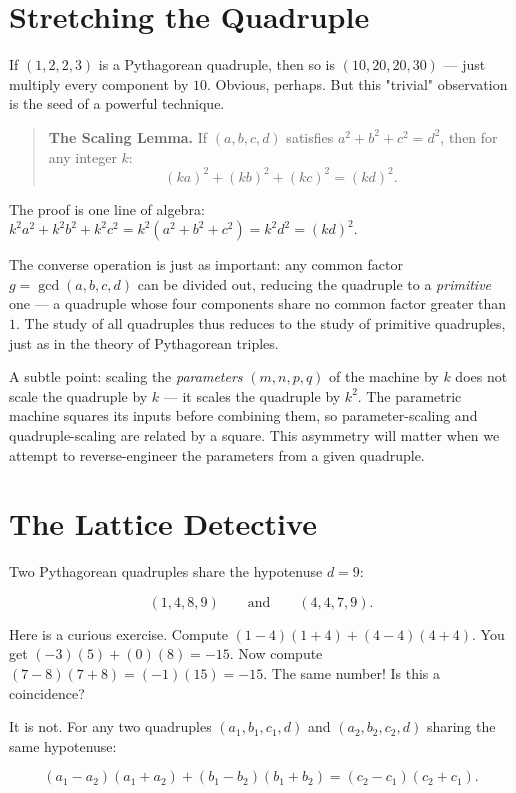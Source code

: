 \documentclass[11pt,twoside,openright]{book}
\theoremstyle{definition}
\theoremstyle{remark}
\begin{document}
\section{Stretching the Quadruple}

If $(1, 2, 2, 3)$ is a Pythagorean quadruple, then so is $(10, 20, 20, 30)$ --- just multiply every component by $10$. Obvious, perhaps. But this "trivial" observation is the seed of a powerful technique.

\begin{quote}
\textbf{The Scaling Lemma.} If $(a, b, c, d)$ satisfies $a^2 + b^2 + c^2 = d^2$, then for any integer $k$:
$$(ka)^2 + (kb)^2 + (kc)^2 = (kd)^2.$$
\end{quote}
The proof is one line of algebra: $k^2 a^2 + k^2 b^2 + k^2 c^2 = k^2(a^2 + b^2 + c^2) = k^2 d^2 = (kd)^2$.

The converse operation is just as important: any common factor $g = \gcd(a, b, c, d)$ can be divided out, reducing the quadruple to a \textit{primitive} one --- a quadruple whose four components share no common factor greater than $1$. The study of all quadruples thus reduces to the study of primitive quadruples, just as in the theory of Pythagorean triples.

A subtle point: scaling the \textit{parameters} $(m, n, p, q)$ of the machine by $k$ does not scale the quadruple by $k$ --- it scales the quadruple by $k^2$. The parametric machine squares its inputs before combining them, so parameter-scaling and quadruple-scaling are related by a square. This asymmetry will matter when we attempt to reverse-engineer the parameters from a given quadruple.



\section{The Lattice Detective}

Two Pythagorean quadruples share the hypotenuse $d = 9$:

\[(1, 4, 8, 9) \qquad \text{and} \qquad (4, 4, 7, 9).\]

Here is a curious exercise. Compute $(1 - 4)(1 + 4) + (4 - 4)(4 + 4)$. You get $(-3)(5) + (0)(8) = -15$. Now compute $(7 - 8)(7 + 8) = (-1)(15) = -15$. The same number! Is this a coincidence?

It is not. For any two quadruples $(a_1, b_1, c_1, d)$ and $(a_2, b_2, c_2, d)$ sharing the same hypotenuse:

\[(a_1 - a_2)(a_1 + a_2) + (b_1 - b_2)(b_1 + b_2) = (c_2 - c_1)(c_2 + c_1).\]
\end{document}
